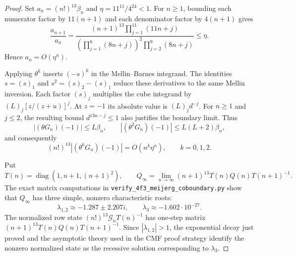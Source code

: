 \documentclass[oneside,english,11pt]{amsart}
\begin{document}
\begin{proof}
Set $a_n=(n!)^{13}\beta_n$ and $\eta=11^{11}/4^{24}<1$.
For $n\geq1$, bounding each numerator factor by $11(n+1)$
and each denominator factor by $4(n+1)$ gives
\[
\frac{a_{n+1}}{a_n}
=\frac{(n+1)^{13}\prod_{j=1}^{11}(11n+j)}
       {\left(\prod_{j=1}^{8}(8n+j)\right)^2
        \prod_{j=2}^{9}(8n+j)}
\leq\eta.
\]
Hence $a_n=O(\eta^n)$.

Applying $\theta^k$ inserts $(-s)^k$ in the Mellin--Barnes
integrand. The identities $s=(s)_1$ and $s^2=(s)_2-(s)_1$
reduce these derivatives to the same Mellin inversion.
Each factor $(s)_j$ multiplies the cube integrand by
$(L)_j[z/(z+u)]^j$. At $z=-1$ its absolute value is
$(L)_jd^{-j}$. For $n\geq1$ and $j\leq2$, the resulting bound
$d^{13n-j}\leq1$ also justifies the boundary limit. Thus
\[
|(\theta G_n)(-1)|\leq L\beta_n,\qquad
|(\theta^2G_n)(-1)|\leq L(L+2)\beta_n,
\]
and consequently
\[
(n!)^{13}|(\theta^kG_n)(-1)|
=O(n^k\eta^n),\qquad k=0,1,2.
\]

Put
\[
T(n)=\operatorname{diag}(1,n+1,(n+1)^2),\qquad
Q_\infty=\lim_{n\to\infty}(n+1)^{13}T(n)Q(n)T(n+1)^{-1}.
\]
The exact matrix computations in
\texttt{verify\_4f3\_meijerg\_coboundary.py}
show that $Q_\infty$ has three simple, nonzero characteristic roots:
\[
\lambda_{1,2}\approx-1.287\pm2.207i,\qquad
\lambda_3\approx-1.602\cdot10^{-27}.
\]
The normalized row state $(n!)^{13}\mathcal G_nT(n)^{-1}$
has one-step matrix $(n+1)^{13}T(n)Q(n)T(n+1)^{-1}$.
Since $|\lambda_{1,2}|>1$, the exponential decay just proved
and the asymptotic theory used in the CMF proof strategy identify
the nonzero normalized state as the recessive solution corresponding
to $\lambda_3$.
\end{proof}
\end{document}
